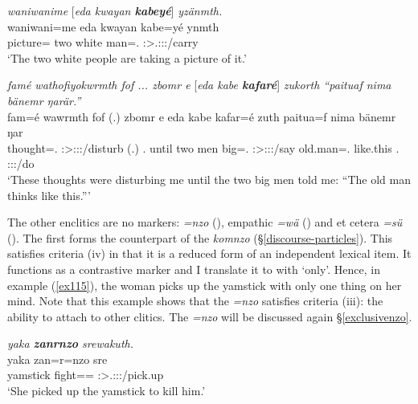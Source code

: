 \begin{exe}
	\ex \emph{waniwanime} [\emph{eda kwayan \textbf{kabeyé}}] \emph{yzänmth.}\\
	\gll waniwani=me eda kwayan {kabe=yé} ynmth\\
	picture=\Ins{} two white man=\Erg.\Nsg{} \Stdu:\Sbj>\Tsg.\Masc:\Obj:\Nonpast:\Ipfv/carry\\
	\trans `The two white people are taking a picture of it.' 
	\label{ex498}
\end{exe}
\begin{exe}
	\ex \emph{famé wathofiyokwrmth fof ... zbomr e} [\emph{eda kabe \textbf{kafaré}}]\emph{ zukorth ``paituaf nima bänemr ŋarär.''}\\
	\gll fam=é wawrmth fof (.) zbomr e eda kabe kafar=é zuth paitua=f nima bänemr ŋar\\
	thought=\Erg.\Nsg{} \Stpl:\Sbj>\Fsg:\Obj:\Rpst:\Dur/disturb \Emph{} (.) \Prox.\Purp{} until two men big=\Erg.\Nsg{} \Stdu:\Sbj>\Fsg:\Obj:\Rpst:\Pfv/say {old.man=\Erg.\Sg} {like.this} \Med.\Purp{} \Stsg:\Sbj:\Nonpast:\Ipfv/do\\
	\trans `These thoughts were disturbing me until the two big men told me: ``The old man thinks like this.''' 
	\label{ex499}
\end{exe}

The other  enclitics are no  markers:  \emph{=nzo} (\Only), empathic \emph{=wä} (\Emph) and et cetera \emph{=sü} (\Etc). The first forms the  counterpart of the  \emph{komnzo} (\S{}\ref{discourse-particles}). This  satisfies criteria (iv) in that it is a reduced form of an independent lexical item. It functions as a contrastive  marker and I translate it to with  `only'. Hence, in example (\ref{ex115}), the woman picks up the yamstick with only one thing on her mind. Note that this example shows that the  \emph{=nzo} satisfies criteria (iii): the ability to attach to other clitics. The   \emph{=nzo} will be discussed again \S{}\ref{exclusivenzo}.

\begin{exe}
	\ex \emph{yaka \textbf{zanrnzo} srewakuth.}\\
	\gll yaka zan=r=nzo sre\\
	yamstick fight=\Purp{}=\Only{} \Stsg:\Sbj>\Tsg.\Masc:\Obj:\Irr:\Pfv/pick.up\\
	\trans `She picked up the yamstick to kill him.' 
	\label{ex115}
\end{exe}

